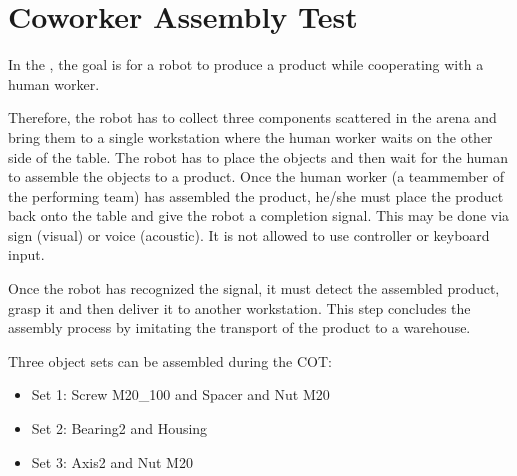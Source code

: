 
\section{Coworker Assembly Test}

In the , 
the goal is for a robot to produce a product while cooperating with a human worker.

Therefore, the robot has to collect three components scattered in the arena and bring them to a single workstation where the human worker waits on the other side of the table.
The robot has to place the objects and then wait for the human to assemble the objects to a product.
Once the human worker (a teammember of the performing team) has assembled the product, he/she must place the product back onto the table and give the robot a completion signal. This may be done via sign (visual) or voice (acoustic). It is not allowed to use controller or keyboard input.

Once the robot has recognized the signal, 
it must detect the assembled product, grasp it and then deliver it to another workstation.
This step concludes the assembly process by imitating the transport of the product to a warehouse.

Three object sets can be assembled during the COT: 
\begin{itemize}
	\item Set 1: Screw M20\_100 and Spacer and Nut M20
	\item Set 2: Bearing2 and  Housing
	\item Set 3: Axis2 and Nut M20  
\end{itemize}
